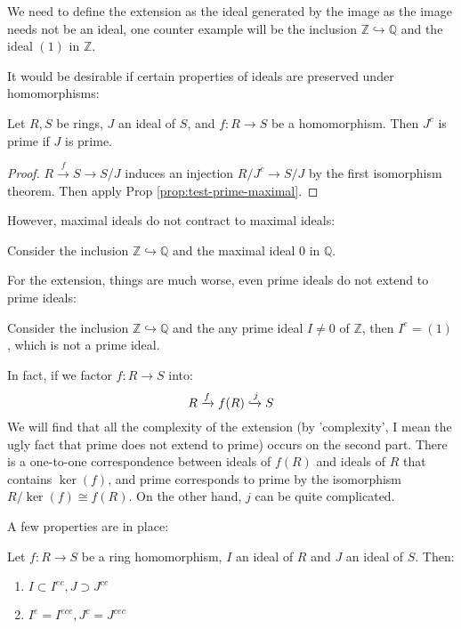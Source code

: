 \documentclass{note-eng}
\begin{document}
We need to define the extension as the ideal generated by the image as the image needs not be an ideal, one counter example will be the inclusion $\mathbb{Z} \hookrightarrow \mathbb{Q}$ and the ideal $(1)$ in $\mathbb{Z}$.

It would be desirable if certain properties of ideals are preserved under homomorphisms:

\begin{proposition}
    Let $R, S$ be rings, $J$ an ideal of $S$, and $f: R \rightarrow S$ be a homomorphism. Then $J^c$ is prime if $J$ is prime.
\end{proposition}

\begin{proof}
    $R \xrightarrow{f} S \rightarrow S / J$ induces an injection $R / J^c \rightarrow S / J$ by the first isomorphism theorem. Then apply Prop \ref{prop:test-prime-maximal}.
\end{proof}

However, maximal ideals do not contract to maximal ideals:

\begin{example}
    Consider the inclusion $\mathbb{Z} \hookrightarrow \mathbb{Q}$ and the maximal ideal $0$ in $\mathbb{Q}$. 
\end{example}

For the extension, things are much worse, even prime ideals do not extend to prime ideals:

\begin{example}
    Consider the inclusion $\mathbb{Z} \hookrightarrow \mathbb{Q}$ and the any prime ideal $I \ne 0$ of $\mathbb{Z}$, then $I^e = (1)$, which is not a prime ideal.
\end{example}

In fact, if we factor $f: R \rightarrow S$ into:
$$R \xrightarrow{f} f(R) \xhookrightarrow{j} S$$
We will find that all the complexity of the extension (by 'complexity', I mean the ugly fact that prime does not extend to prime) occurs on the second part. There is a one-to-one correspondence between ideals of $f(R)$ and ideals of $R$ that contains $\ker(f)$, and prime corresponds to prime by the isomorphism $R / \ker (f) \cong f(R)$. On the other hand, $j$ can be quite complicated.

A few properties are in place:

\begin{proposition}
    Let $f: R \rightarrow S$ be a ring homomorphism, $I$ an ideal of $R$ and $J$ an ideal of $S$. Then:
    \begin{enumerate}
        \item $I \subset I^{ec}, J \supset J^{ce}$
        \item $I^e = I^{ece}, J^c = J^{cec}$
    \end{enumerate}
\end{proposition}
\end{document}
